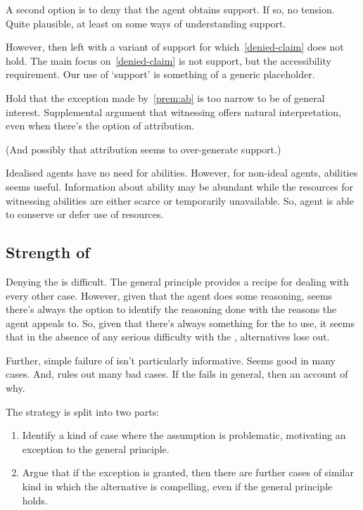 \documentclass[10pt]{article}
\begin{document}
\begin{note}
A second option is to deny that the agent obtains support.
If so, no tension.
Quite plausible, at least on some ways of understanding support.

However, then left with a variant of support for which~\ref{denied-claim} does not hold.
The main focus on~\ref{denied-claim} is not support, but the accessibility requirement.
Our use of `support' is something of a generic placeholder.
\end{note}

\begin{note}
  Hold that the exception made by~\ref{prem:ab} is too narrow to be of general interest.
  Supplemental argument that witnessing offers natural interpretation, even when there's the option of attribution.

  (And possibly that attribution seems to over-generate support.)
\end{note}

\begin{note}
  Idealised agents have no need for abilities.
However, for non-ideal agents, abilities seems useful.
Information about ability may be abundant while the resources for witnessing abilities are either scarce or temporarily unavailable.
So, agent is able to conserve or defer use of resources.
\end{note}


\subsection{Strength of \mp{}}
\label{sec:appeal-main-premise}

Denying the \mp{} is difficult.
The general principle provides a recipe for dealing with every other case.
However, given that the agent does some reasoning, seems there's always the option to identify the reasoning done with the reasons the agent appeals to.
So, given that there's always something for the \mp{} to use, it seems that in the absence of any serious difficulty with the \mp{}, alternatives lose out.

Further, simple failure of \mp{} isn't particularly informative.
Seems good in many cases.
And, rules out many bad cases.
If the \mp{} fails in general, then an account of why.

The strategy is split into two parts:
\begin{enumerate}
\item Identify a kind of case where the assumption is problematic, motivating an exception to the general principle.
\item Argue that if the exception is granted, then there are further cases of similar kind in which the alternative is compelling, even if the general principle holds.
\end{enumerate}
\end{document}
